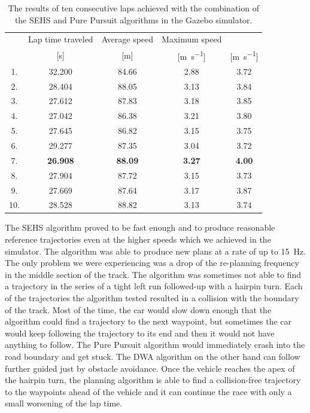 \begin{table}
	\centering
	\label{tbl:pure-pursuit}
	\begin{tabular}{c c c c c}
		\toprule
		& Lap time       traveled  & Average speed             & Maximum speed             \\
		& [\si{\second}] & [\si{\meter}]      & [\si{\meter\per\second}]  & [\si{\meter\per\second}]  \\
		\midrule
		1.  & 32.200 & 84.66 & 2.88 & 3.72 \\
		2.  & 28.404 & 88.05 & 3.13 & 3.84 \\
		3.  & 27.612 & 87.83 & 3.18 & 3.85 \\
		4.  & 27.042 & 86.38 & 3.21 & 3.80 \\
		5.  & 27.645 & 86.82 & 3.15 & 3.75 \\
		6.  & 29.277 & 87.35 & 3.04 & 3.72 \\
		7.  & \textbf{26.908} & \textbf{88.09} & \textbf{3.27} & \textbf{4.00} \\
		8.  & 27.904 & 87.72 & 3.15 & 3.73 \\
		9.  & 27.669 & 87.64 & 3.17 & 3.87 \\
		10. & 28.528 & 88.82 & 3.13 & 3.74 \\

		\bottomrule
	\end{tabular}
	\caption{The results of ten consecutive laps achieved with the combination of the SEHS and Pure Pursuit algorithms in the Gazebo simulator.}
\end{table}



The \gls{SEHS} algorithm proved to be fast enough and to produce reasonable reference trajectories even at the higher speeds which we achieved in the simulator. The algorithm was able to produce new plans at a rate of up to \SI{15}{\hertz}. The only problem we were experiencing was a drop of the re-planning frequency in the middle section of the track. The algorithm was sometimes not able to find a trajectory in the series of a tight left run followed-up with a hairpin turn. Each of the trajectories the algorithm tested resulted in a collision with the boundary of the track. Most of the time, the car would slow down enough that the algorithm could find a trajectory to the next waypoint, but sometimes the car would keep following the trajectory to its end and then it would not have anything to follow. The Pure Pursuit algorithm would immediately crash into the road boundary and get stuck. The \gls*{DWA} algorithm on the other hand can follow further guided just by obstacle avoidance. Once the vehicle reaches the apex of the hairpin turn, the planning algorithm is able to find a collision-free trajectory to the waypoints ahead of the vehicle and it can continue the race with only a small worsening of the lap time.

